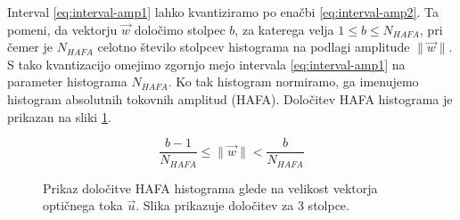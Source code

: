 Interval \eqref{eq:interval-amp1} lahko kvantiziramo po enačbi \eqref{eq:interval-amp2}. Ta pomeni, da vektorju $\vec{w}$ določimo stolpec $b$, za katerega velja $1 \leq b \leq N_{HAFA}$, pri čemer je $N_{HAFA}$ celotno število stolpcev histograma na podlagi amplitude $\| \vec{w} \|$. S tako kvantizacijo omejimo zgornjo mejo intervala \eqref{eq:interval-amp1} na parameter histograma $N_{HAFA}$. Ko tak histogram normiramo, ga imenujemo histogram absolutnih tokovnih amplitud (HAFA). Določitev HAFA histograma je prikazan na sliki \ref{fig:hafa-histogram}.

\begin{equation}\label{eq:interval-amp2}
	\frac{b-1}{N_{HAFA}} \leq \| \vec{w} \| < \frac{b}{N_{HAFA}}
\end{equation}




\begin{figure}[htb]
\centering

\caption[Prikaz določitve HAFA histograma glede na velikost vektorja]{Prikaz določitve HAFA histograma glede na velikost vektorja optičnega toka $\vec{u}$. Slika prikazuje določitev za $3$ stolpce.}
\label{fig:hafa-histogram}
\end{figure}